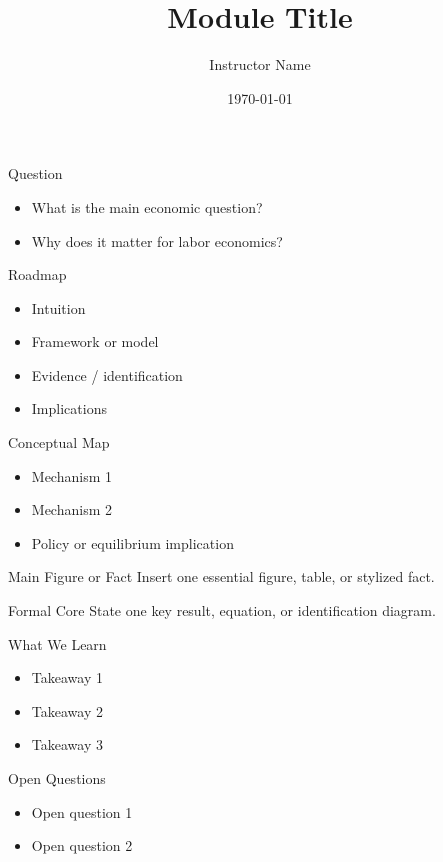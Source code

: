 \documentclass{beamer}
\title{Module Title}
\author{Instructor Name}
\date{\today}
\begin{document}
\frame{\titlepage}

\begin{frame}{Question}
\begin{itemize}
    \item What is the main economic question?
    \item Why does it matter for labor economics?
\end{itemize}
\end{frame}

\begin{frame}{Roadmap}
\begin{itemize}
    \item Intuition
    \item Framework or model
    \item Evidence / identification
    \item Implications
\end{itemize}
\end{frame}

\begin{frame}{Conceptual Map}
\begin{itemize}
    \item Mechanism 1
    \item Mechanism 2
    \item Policy or equilibrium implication
\end{itemize}
\end{frame}

\begin{frame}{Main Figure or Fact}
Insert one essential figure, table, or stylized fact.
\end{frame}

\begin{frame}{Formal Core}
State one key result, equation, or identification diagram.
\end{frame}

\begin{frame}{What We Learn}
\begin{itemize}
    \item Takeaway 1
    \item Takeaway 2
    \item Takeaway 3
\end{itemize}
\end{frame}

\begin{frame}{Open Questions}
\begin{itemize}
    \item Open question 1
    \item Open question 2
\end{itemize}
\end{frame}
\end{document}
